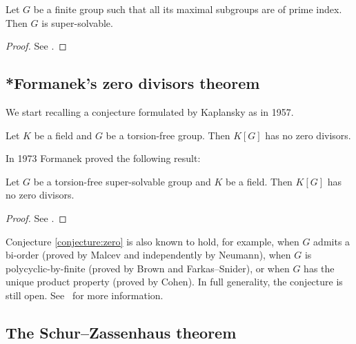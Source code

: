 \begin{theorem}[Huppert]
\label{thm:Huppert}
Let $G$ be a finite group such that all its maximal subgroups 
are of prime index. Then $G$ is super-solvable. 
\end{theorem}

\begin{proof}
    See \cite[Theorem 10.5.8]{MR414669}.
\end{proof}

\subsection{*Formanek's zero divisors theorem}

We start recalling a conjecture formulated by Kaplansky as \cite[Problem 6]{MR0096696} in 1957. 

\begin{conjecture}[Kaplansky]
\label{conjecture:zero}
    Let $K$ be a field and $G$ be a torsion-free group. 
    Then $K[G]$ has no zero divisors. 
\end{conjecture}

In 1973 Formanek proved the following result:

\begin{theorem}[Formanek]
    \label{thm:Formanek:zerodivisors}
        Let $G$ be a torsion-free super-solvable 
        group and $K$ be a field. Then $K[G]$ has no zero divisors. 
\end{theorem}

\begin{proof}
    See \cite[Thoerem 13.3.9]{MR798076}.
\end{proof}

Conjecture \ref{conjecture:zero} is also known to hold, for example, when $G$ admits a bi-order (proved by Malcev and independently by Neumann), when $G$ is polycyclic-by-finite (proved by Brown and Farkas--Snider), or when $G$ has the unique product property (proved by Cohen).  In full generality, the conjecture is still open. See~\cite[Chapter 13]{MR798076} for more information. 


\subsection{The Schur--Zassenhaus theorem}


